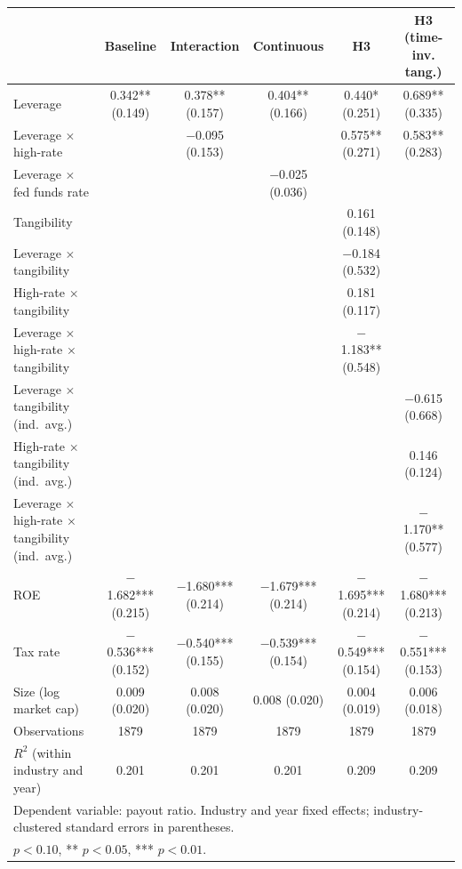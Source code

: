 \begin{tabular}{lccccc}
\toprule
 & Baseline & Interaction & Continuous & H3 & H3 (time-inv. tang.) \\
\midrule
Leverage & 0.342** (0.149) & 0.378** (0.157) & 0.404** (0.166) & 0.440* (0.251) & 0.689** (0.335) \\
Leverage $\times$ high-rate &  & $-$0.095 (0.153) &  & 0.575** (0.271) & 0.583** (0.283) \\
Leverage $\times$ fed funds rate &  &  & $-$0.025 (0.036) &  &  \\
Tangibility &  &  &  & 0.161 (0.148) &  \\
Leverage $\times$ tangibility &  &  &  & $-$0.184 (0.532) &  \\
High-rate $\times$ tangibility &  &  &  & 0.181 (0.117) &  \\
Leverage $\times$ high-rate $\times$ tangibility &  &  &  & $-$1.183** (0.548) &  \\
Leverage $\times$ tangibility (ind.\ avg.) &  &  &  &  & $-$0.615 (0.668) \\
High-rate $\times$ tangibility (ind.\ avg.) &  &  &  &  & 0.146 (0.124) \\
Leverage $\times$ high-rate $\times$ tangibility (ind.\ avg.) &  &  &  &  & $-$1.170** (0.577) \\
ROE & $-$1.682*** (0.215) & $-$1.680*** (0.214) & $-$1.679*** (0.214) & $-$1.695*** (0.214) & $-$1.680*** (0.213) \\
Tax rate & $-$0.536*** (0.152) & $-$0.540*** (0.155) & $-$0.539*** (0.154) & $-$0.549*** (0.154) & $-$0.551*** (0.153) \\
Size (log market cap) & 0.009 (0.020) & 0.008 (0.020) & 0.008 (0.020) & 0.004 (0.019) & 0.006 (0.018) \\
Observations & 1879 & 1879 & 1879 & 1879 & 1879 \\
$R^2$ (within industry and year) & 0.201 & 0.201 & 0.201 & 0.209 & 0.209 \\
\bottomrule
\multicolumn{6}{l}{\footnotesize Dependent variable: payout ratio. Industry and year fixed effects; industry-clustered standard errors in parentheses.}\\
\multicolumn{6}{l}{\footnotesize * $p<0.10$, ** $p<0.05$, *** $p<0.01$.}\\
\end{tabular}
